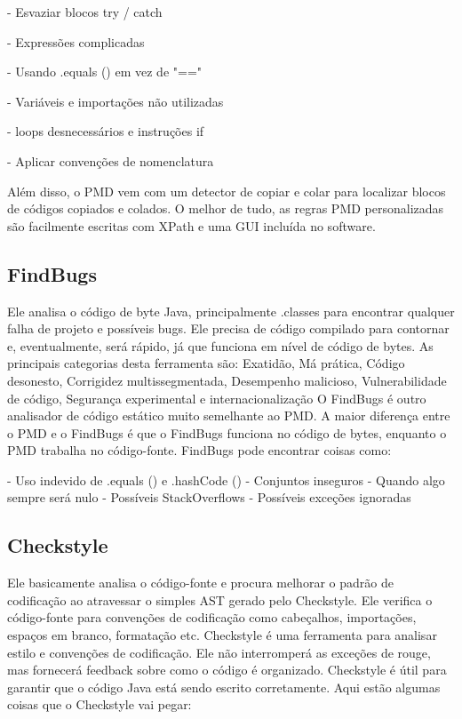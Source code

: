 \documentclass[12pt]{article}
\begin{document}
- Esvaziar blocos try / catch

- Expressões complicadas

- Usando .equals () em vez de "=="

- Variáveis e importações não utilizadas

- loops desnecessários e instruções if

- Aplicar convenções de nomenclatura

Além disso, o PMD vem com um detector de copiar e colar para localizar blocos de códigos copiados e colados. O melhor de tudo, as regras PMD personalizadas são facilmente escritas com XPath e uma GUI incluída no software.

\subsection{FindBugs} \label{sec:findbugs}
Ele analisa o código de byte Java, principalmente .classes para encontrar qualquer falha de projeto e possíveis bugs.
     Ele precisa de código compilado para contornar e, eventualmente, será rápido, já que funciona em nível de código de bytes.
     As principais categorias desta ferramenta são: Exatidão, Má prática, Código desonesto, Corrigidez multissegmentada, Desempenho malicioso, Vulnerabilidade de código, Segurança experimental e internacionalização
		O FindBugs é outro analisador de código estático muito semelhante ao PMD. A maior diferença entre o PMD e o FindBugs é que o FindBugs funciona no código de bytes, enquanto o PMD trabalha no código-fonte. FindBugs pode encontrar coisas como:

- Uso indevido de .equals () e .hashCode ()
- Conjuntos inseguros
- Quando algo sempre será nulo
- Possíveis StackOverflows
- Possíveis exceções ignoradas

\subsection{Checkstyle} \label{sec:checkstyle}
Ele basicamente analisa o código-fonte e procura melhorar o padrão de codificação ao atravessar o simples AST gerado pelo Checkstyle.
     Ele verifica o código-fonte para convenções de codificação como cabeçalhos, importações, espaços em branco, formatação etc.
		Checkstyle é uma ferramenta para analisar estilo e convenções de codificação. Ele não interromperá as exceções de rouge, mas fornecerá feedback sobre como o código é organizado. Checkstyle é útil para garantir que o código Java está sendo escrito corretamente. Aqui estão algumas coisas que o Checkstyle vai pegar:
\end{document}

